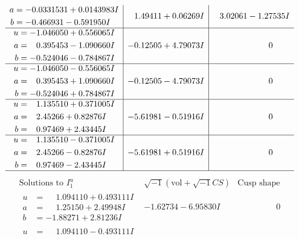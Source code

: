 \documentclass[1p]{elsarticle_modified}
\theoremstyle{definition}
\newcommand{\I}{\sqrt{-1}}
\begin{document}
$$\begin{array}{c|c|c}
\begin{aligned}
a &= -0.0331531 + 0.0143983 I \\
b &= -0.466931 - 0.591950 I\end{aligned}
 & \phantom{-}1.49411 + 0.06269 I & \phantom{-}3.02061 - 1.27535 I \\ \hline\begin{aligned}
u &= -1.046050 + 0.556065 I \\
a &= \phantom{-}0.395453 - 1.090660 I \\
b &= -0.524046 - 0.784867 I\end{aligned}
 & -0.12505 + 4.79073 I & \phantom{-0.000000 } 0 \\ \hline\begin{aligned}
u &= -1.046050 - 0.556065 I \\
a &= \phantom{-}0.395453 + 1.090660 I \\
b &= -0.524046 + 0.784867 I\end{aligned}
 & -0.12505 - 4.79073 I & \phantom{-0.000000 } 0 \\ \hline\begin{aligned}
u &= \phantom{-}1.135510 + 0.371005 I \\
a &= \phantom{-}2.45266 + 0.82876 I \\
b &= \phantom{-}0.97469 + 2.43445 I\end{aligned}
 & -5.61981 - 0.51916 I & \phantom{-0.000000 } 0 \\ \hline\begin{aligned}
u &= \phantom{-}1.135510 - 0.371005 I \\
a &= \phantom{-}2.45266 - 0.82876 I \\
b &= \phantom{-}0.97469 - 2.43445 I\end{aligned}
 & -5.61981 + 0.51916 I & \phantom{-0.000000 } 0\\
 \hline 
 \end{array}$$\newpage$$\begin{array}{c|c|c}  
\text{Solutions to }I^u_{1}& \I (\text{vol} + \sqrt{-1}CS) & \text{Cusp shape}\\
 \hline 
\begin{aligned}
u &= \phantom{-}1.094110 + 0.493111 I \\
a &= \phantom{-}1.25150 + 2.49948 I \\
b &= -1.88271 + 2.81236 I\end{aligned}
 & -1.62734 - 6.95830 I & \phantom{-0.000000 } 0 \\ \hline\begin{aligned}
u &= \phantom{-}1.094110 - 0.493111 I \\

\end{aligned}
\end{array}$$
\end{document}
